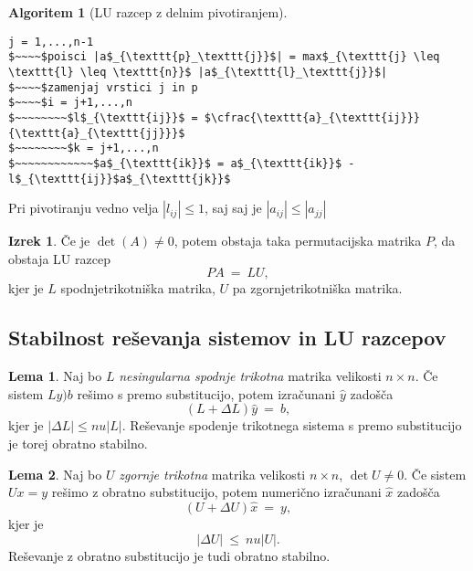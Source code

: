 \documentclass[11pt]{article}
\theoremstyle{definition}
\newtheorem{lema}{Lema}
\newtheorem{izrek}{Izrek}
\newtheorem*{algoritem}{Algoritem}
\begin{document}
\begin{algoritem}[LU razcep z delnim pivotiranjem]
~
\begin{lstlisting}
j = 1,...,n-1
$~~~~$poisci |a$_{\texttt{p}_\texttt{j}}$| = max$_{\texttt{j} \leq \texttt{l} \leq \texttt{n}}$ |a$_{\texttt{l}_\texttt{j}}$|
$~~~~$zamenjaj vrstici j in p
$~~~~$i = j+1,...,n
$~~~~~~~~$l$_{\texttt{ij}}$ = $\cfrac{\texttt{a}_{\texttt{ij}}}{\texttt{a}_{\texttt{jj}}}$
$~~~~~~~~$k = j+1,...,n
$~~~~~~~~~~~~$a$_{\texttt{ik}}$ = a$_{\texttt{ik}}$ - l$_{\texttt{ij}}$a$_{\texttt{jk}}$
\end{lstlisting}
Pri pivotiranju vedno velja $|l_{ij}| \leq 1$, saj saj je $|a_{ij}| \leq |a_{jj}|$ 

\end{algoritem}
\vspace{0.5cm}

\begin{izrek}

Če je $\det{(A)} \neq 0$, potem obstaja taka permutacijska matrika $P$, da obstaja LU razcep 
$$PA ~=~ LU,$$
kjer je $L$ spodnjetrikotniška matrika, $U$ pa zgornjetrikotniška matrika.

\end{izrek}
\vspace{0.5cm}


\subsection{Stabilnost reševanja sistemov in LU razcepov}
\vspace{0.5cm}

\begin{lema}

Naj bo $L$ \textit{nesingularna spodnje trikotna} matrika velikosti $n \times n$. Če sistem $Ly ) b$ rešimo s premo substitucijo, potem izračunani $\hat{y}$ zadošča
$$(L + \Delta L) \hat{y} ~=~ b,$$
kjer je $|\Delta L| \leq n u |L|$. Reševanje spodenje trikotnega sistema s premo substitucijo je torej obratno stabilno.

\end{lema}
\vspace{0.5cm}

\begin{lema}

Naj bo $U$ \textit{zgornje trikotna} matrika velikosti $n \times n$, $\det{U} \neq 0$. Če sistem $Ux = y$ rešimo z obratno substitucijo, potem numerično izračunani $\hat{x}$ zadošča
$$(U + \Delta U) \hat{x} ~=~ y,$$
kjer je 
$$|\Delta U| ~\leq~ n u |U|.$$ 
Reševanje z obratno substitucijo je tudi obratno stabilno.

\end{lema}
\vspace{0.5cm}
\end{document}
